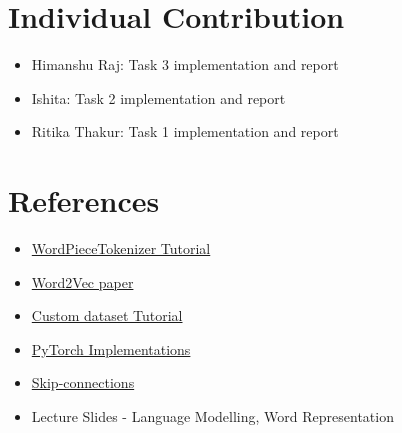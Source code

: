 \documentclass{article}
\begin{document}
\section{Individual Contribution}
\begin{itemize}
    \item Himanshu Raj: Task 3 implementation and report
    \item Ishita: Task 2 implementation and report
    \item Ritika Thakur: Task 1 implementation and report
\end{itemize}

\section{References}
\begin{itemize}
    \item \href{https://www.youtube.com/watch?v=qpv6ms_t_1A&t=1s}{WordPieceTokenizer Tutorial} 
    \item \href{https://arxiv.org/pdf/1301.3781}{Word2Vec paper}
    \item \href{https://pytorch.org/tutorials/beginner/basics/data_tutorial.html}{Custom dataset Tutorial}
    \item \href{https://github.com/rahisenpai/CSE343-ML/blob/main/asgn4/code_c.ipynb}{PyTorch Implementations}
    \item \href{https://www.researchgate.net/figure/Different-skip-connection-schemes-a-No-skip-connection-b-Distinct-source-skip_fig1_329750500}{Skip-connections}
    \item Lecture Slides - Language Modelling, Word Representation
\end{itemize}
\end{document}
